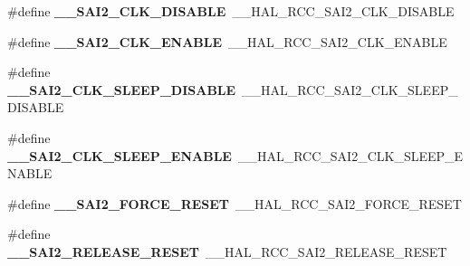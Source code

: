 \begin{DoxyCompactItemize}
\item 
\hypertarget{group___h_a_l___r_c_c___aliased_gadec8489576c1a83913f620c66517bff6}{\#define {\bfseries \-\_\-\-\_\-\-S\-A\-I2\-\_\-\-C\-L\-K\-\_\-\-D\-I\-S\-A\-B\-L\-E}~\-\_\-\-\_\-\-H\-A\-L\-\_\-\-R\-C\-C\-\_\-\-S\-A\-I2\-\_\-\-C\-L\-K\-\_\-\-D\-I\-S\-A\-B\-L\-E}\label{group___h_a_l___r_c_c___aliased_gadec8489576c1a83913f620c66517bff6}

\item 
\hypertarget{group___h_a_l___r_c_c___aliased_ga918b0825bcbcaadad3cf40c7127c8322}{\#define {\bfseries \-\_\-\-\_\-\-S\-A\-I2\-\_\-\-C\-L\-K\-\_\-\-E\-N\-A\-B\-L\-E}~\-\_\-\-\_\-\-H\-A\-L\-\_\-\-R\-C\-C\-\_\-\-S\-A\-I2\-\_\-\-C\-L\-K\-\_\-\-E\-N\-A\-B\-L\-E}\label{group___h_a_l___r_c_c___aliased_ga918b0825bcbcaadad3cf40c7127c8322}

\item 
\hypertarget{group___h_a_l___r_c_c___aliased_ga3a28b6eb8d71db32559ae19c0c451588}{\#define {\bfseries \-\_\-\-\_\-\-S\-A\-I2\-\_\-\-C\-L\-K\-\_\-\-S\-L\-E\-E\-P\-\_\-\-D\-I\-S\-A\-B\-L\-E}~\-\_\-\-\_\-\-H\-A\-L\-\_\-\-R\-C\-C\-\_\-\-S\-A\-I2\-\_\-\-C\-L\-K\-\_\-\-S\-L\-E\-E\-P\-\_\-\-D\-I\-S\-A\-B\-L\-E}\label{group___h_a_l___r_c_c___aliased_ga3a28b6eb8d71db32559ae19c0c451588}

\item 
\hypertarget{group___h_a_l___r_c_c___aliased_gad98dccd681d974c77f35066e0bc25026}{\#define {\bfseries \-\_\-\-\_\-\-S\-A\-I2\-\_\-\-C\-L\-K\-\_\-\-S\-L\-E\-E\-P\-\_\-\-E\-N\-A\-B\-L\-E}~\-\_\-\-\_\-\-H\-A\-L\-\_\-\-R\-C\-C\-\_\-\-S\-A\-I2\-\_\-\-C\-L\-K\-\_\-\-S\-L\-E\-E\-P\-\_\-\-E\-N\-A\-B\-L\-E}\label{group___h_a_l___r_c_c___aliased_gad98dccd681d974c77f35066e0bc25026}

\item 
\hypertarget{group___h_a_l___r_c_c___aliased_gad4787448c5006a6d9e7839e922d7b851}{\#define {\bfseries \-\_\-\-\_\-\-S\-A\-I2\-\_\-\-F\-O\-R\-C\-E\-\_\-\-R\-E\-S\-E\-T}~\-\_\-\-\_\-\-H\-A\-L\-\_\-\-R\-C\-C\-\_\-\-S\-A\-I2\-\_\-\-F\-O\-R\-C\-E\-\_\-\-R\-E\-S\-E\-T}\label{group___h_a_l___r_c_c___aliased_gad4787448c5006a6d9e7839e922d7b851}

\item 
\hypertarget{group___h_a_l___r_c_c___aliased_gaa733091031d11ce795ed05d634e39ee7}{\#define {\bfseries \-\_\-\-\_\-\-S\-A\-I2\-\_\-\-R\-E\-L\-E\-A\-S\-E\-\_\-\-R\-E\-S\-E\-T}~\-\_\-\-\_\-\-H\-A\-L\-\_\-\-R\-C\-C\-\_\-\-S\-A\-I2\-\_\-\-R\-E\-L\-E\-A\-S\-E\-\_\-\-R\-E\-S\-E\-T}\label{group___h_a_l___r_c_c___aliased_gaa733091031d11ce795ed05d634e39ee7}


\end{DoxyCompactItemize}
